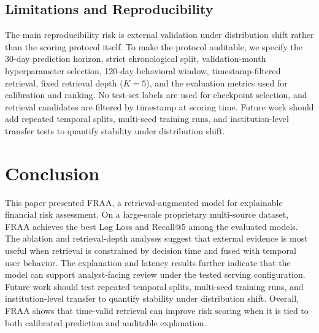 \documentclass[runningheads]{llncs}
\begin{document}
\subsection{Limitations and Reproducibility}
The main reproducibility risk is external validation under distribution shift rather than the scoring protocol itself. To make the protocol auditable, we specify the 30-day prediction horizon, strict chronological split, validation-month hyperparameter selection, 120-day behavioral window, timestamp-filtered retrieval, fixed retrieval depth ($K=5$), and the evaluation metrics used for calibration and ranking. No test-set labels are used for checkpoint selection, and retrieval candidates are filtered by timestamp at scoring time. Future work should add repeated temporal splits, multi-seed training runs, and institution-level transfer tests to quantify stability under distribution shift.

\section{Conclusion}

This paper presented FRAA, a retrieval-augmented model for explainable financial risk assessment. On a large-scale proprietary multi-source dataset, FRAA achieves the best Log Loss and Recall@5 among the evaluated models. The ablation and retrieval-depth analyses suggest that external evidence is most useful when retrieval is constrained by decision time and fused with temporal user behavior. The explanation and latency results further indicate that the model can support analyst-facing review under the tested serving configuration. Future work should test repeated temporal splits, multi-seed training runs, and institution-level transfer to quantify stability under distribution shift. Overall, FRAA shows that time-valid retrieval can improve risk scoring when it is tied to both calibrated prediction and auditable explanation.



\end{document}
